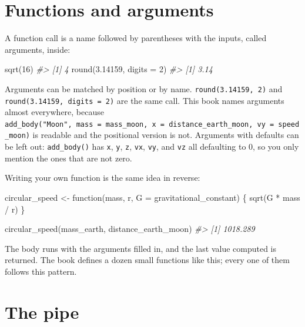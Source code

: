 \documentclass[
  10.5pt,
  letterpaper,
]{scrbook}
\newenvironment{Shaded}{\begin{snugshade}}{\end{snugshade}}
\newcommand{\AttributeTok}[1]{\textcolor[rgb]{0.00,0.00,0.00}{#1}}
\newcommand{\CommentTok}[1]{\textcolor[rgb]{0.00,0.00,0.00}{\textit{#1}}}
\newcommand{\ControlFlowTok}[1]{\textcolor[rgb]{0.00,0.00,0.00}{#1}}
\newcommand{\DecValTok}[1]{\textcolor[rgb]{0.00,0.00,0.00}{#1}}
\newcommand{\FloatTok}[1]{\textcolor[rgb]{0.00,0.00,0.00}{#1}}
\newcommand{\FunctionTok}[1]{\textcolor[rgb]{0.00,0.00,0.00}{#1}}
\newcommand{\NormalTok}[1]{\textcolor[rgb]{0.00,0.00,0.00}{#1}}
\newcommand{\OtherTok}[1]{\textcolor[rgb]{0.00,0.00,0.00}{#1}}
\newcommand{\SpecialCharTok}[1]{\textcolor[rgb]{0.00,0.00,0.00}{#1}}
\theoremstyle{definition}
\theoremstyle{plain}
\theoremstyle{remark}
\begin{document}
\section{Functions and arguments}\label{functions-and-arguments}

A function call is a name followed by parentheses with the inputs,
called arguments, inside:

\begin{Shaded}
\begin{Highlighting}[]
\FunctionTok{sqrt}\NormalTok{(}\DecValTok{16}\NormalTok{)}
\CommentTok{\#\textgreater{} [1] 4}
\FunctionTok{round}\NormalTok{(}\FloatTok{3.14159}\NormalTok{, }\AttributeTok{digits =} \DecValTok{2}\NormalTok{)}
\CommentTok{\#\textgreater{} [1] 3.14}
\end{Highlighting}
\end{Shaded}

Arguments can be matched by position or by name.
\texttt{round(3.14159,\ 2)} and \texttt{round(3.14159,\ digits\ =\ 2)}
are the same call. This book names arguments almost everywhere, because
\texttt{add\_body("Moon",\ mass\ =\ mass\_moon,\ x\ =\ distance\_earth\_moon,\ vy\ =\ speed\_moon)}
is readable and the positional version is not. Arguments with defaults
can be left out: \texttt{add\_body()} has \texttt{x}, \texttt{y},
\texttt{z}, \texttt{vx}, \texttt{vy}, and \texttt{vz} all defaulting to
0, so you only mention the ones that are not zero.

Writing your own function is the same idea in reverse:

\begin{Shaded}
\begin{Highlighting}[]
\NormalTok{circular\_speed }\OtherTok{\textless{}{-}} \ControlFlowTok{function}\NormalTok{(mass, r, }\AttributeTok{G =}\NormalTok{ gravitational\_constant) \{}
  \FunctionTok{sqrt}\NormalTok{(G }\SpecialCharTok{*}\NormalTok{ mass }\SpecialCharTok{/}\NormalTok{ r)}
\NormalTok{\}}

\FunctionTok{circular\_speed}\NormalTok{(mass\_earth, distance\_earth\_moon)}
\CommentTok{\#\textgreater{} [1] 1018.289}
\end{Highlighting}
\end{Shaded}

The body runs with the arguments filled in, and the last value computed
is returned. The book defines a dozen small functions like this; every
one of them follows this pattern.

\section{The pipe}\label{the-pipe}
\end{document}
